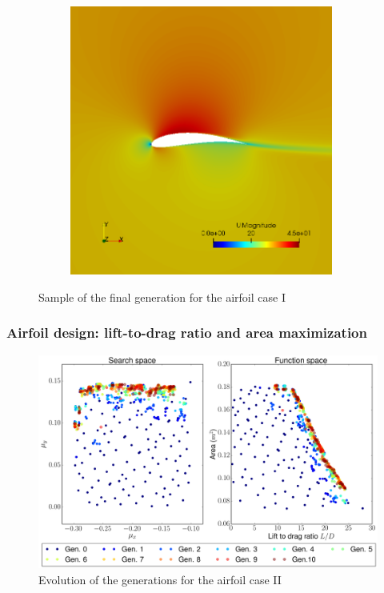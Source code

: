\begin{figure}[h!]
\begin{subfigure}[t]{0.31\textwidth}
    \end{subfigure}
    \begin{subfigure}[t]{0.31\textwidth}
        \includegraphics[width=0.95\textwidth, height=0.17\textheight]{Figures/4/g10i55.png}
    \end{subfigure}
    \caption{Sample of the final generation for the airfoil case I}
    \label{fig:finalCLCD}
\end{figure}

    
\subsubsection*{Airfoil design: lift-to-drag ratio and area maximization}

     \begin{figure}[h!]
        \centering
        \small
        \includegraphics[width=\textwidth, height=0.4\textheight]{Figures/4/LDgen10.png}
        \caption{Evolution of the generations for the airfoil case II}
        \label{fig:genForLD}
    \end{figure}
    
